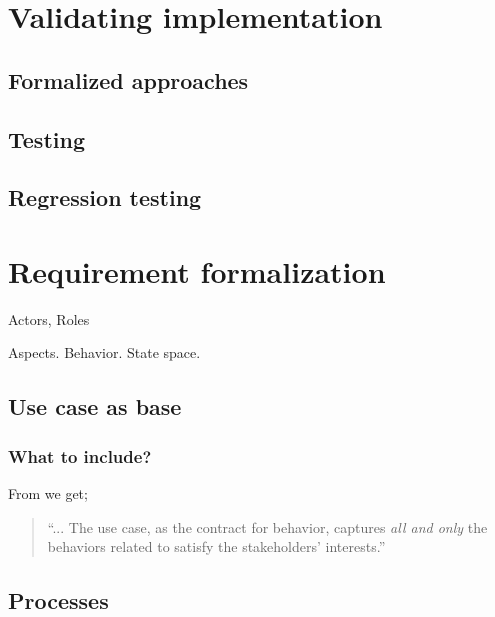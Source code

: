 
\chapter{Validating implementation}

\section{Formalized approaches}
\section{Testing}

\section{Regression testing}

\chapter{Requirement formalization}
Actors, Roles

Aspects. Behavior. State space.

\section{Use case as base}

\subsection{What to include?}
From \cite{Cockburn:2000:WEU:517669} we get;
\begin{quote}
``... The use case, as the contract for behavior, captures \emph{all and only} the behaviors related to satisfy the stakeholders’ interests.''
\end{quote}

\section{Processes}

